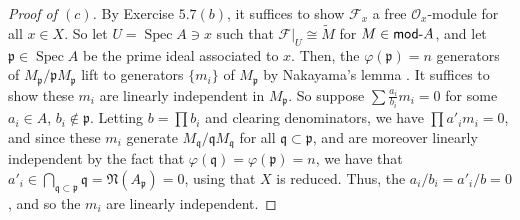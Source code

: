 \documentclass[10pt]{article}
\theoremstyle{definition}
\theoremstyle{remark}
\numberwithin{equation}{section}
\numberwithin{figure}{subsubsection}
\DeclareMathOperator{\Spec}{Spec}
\newcommand{\FF}{\mathscr{F}}
\newcommand{\OO}{\mathcal{O}}
\newcommand{\Mod}{\mathsf{mod}\mathchar`-}
\begin{document}
\begin{proof}[Proof of $(c)$]
  By Exercise $5.7(b)$, it suffices to show $\FF_x$ a free $\OO_x$-module for all $x \in X$. So let $U = \Spec A \ni x$ such that $\FF\vert_U \cong \tilde{M}$ for $M \in \Mod A$, and let $\mathfrak{p} \in \Spec A$ be the prime ideal associated to $x$. Then, the $\varphi(\mathfrak{p}) = n$ generators of $M_\mathfrak{p}/\mathfrak{p}M_\mathfrak{p}$ lift to generators $\{m_i\}$ of $M_\mathfrak{p}$ by Nakayama's lemma \cite[Prop.~2.8]{AM69}. It suffices to show these $m_i$ are linearly independent in $M_\mathfrak{p}$. So suppose $\sum \frac{a_i}{b_i} m_i = 0$ for some $a_i \in A$, $b_i \notin \mathfrak{p}$. Letting $b = \prod b_i$ and clearing denominators, we have $\prod a'_im_i = 0$, and since these $m_i$ generate $M_\mathfrak{q}/\mathfrak{q}M_\mathfrak{q}$ for all $\mathfrak{q} \subset \mathfrak{p}$, and are moreover linearly independent by the fact that $\varphi(\mathfrak{q}) = \varphi(\mathfrak{p}) = n$, we have that $a'_i \in \bigcap_{\mathfrak{q} \subset \mathfrak{p}} \mathfrak{q} = \mathfrak{N}(A_\mathfrak{p}) = 0$, using that $X$ is reduced. Thus, the $a_i/b_i = a'_i/b = 0$, and so the $m_i$ are linearly independent.
\end{proof}
\end{document}
